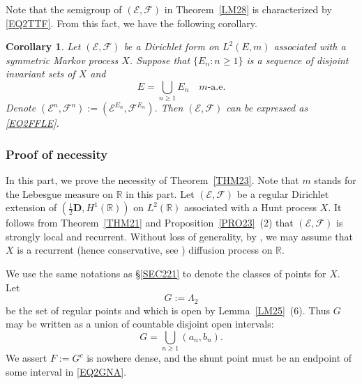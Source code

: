\documentclass[a4paper]{amsart}
\newtheorem{corollary}[theorem]{Corollary}
\theoremstyle{definition}
\theoremstyle{remark}
\numberwithin{equation}{section}
\begin{document}
Note that the semigroup of $({{\mathcal{E}}},{{\mathcal{F}}})$ in Theorem~\ref{LM28} is characterized by \eqref{EQ2TTF}. From this fact, we have the following corollary.

\begin{corollary}\label{COR210}
Let $({{\mathcal{E}}},{{\mathcal{F}}})$ be a Dirichlet form on $L^2(E,m)$ associated with a symmetric Markov process $X$. Suppose that $\{E_n:n\geq 1\}$ is a sequence of disjoint invariant sets of $X$ and
\[
	E=\bigcup_{n\geq 1}E_n \quad m\text{-a.e.}
\]
Denote $({{\mathcal{E}}}^n,{{\mathcal{F}}}^n):=({{\mathcal{E}}}^{E_n}, {{\mathcal{F}}}^{E_n})$. Then $({{\mathcal{E}}},{{\mathcal{F}}})$ can be expressed as \eqref{EQ2FFLE}.
\end{corollary}

\subsubsection{Proof of necessity}\label{SEC224}

In this part, we prove the necessity of Theorem~\ref{THM23}. Note that $m$ stands for the Lebesgue measure on $\mathbb{R}$ in this part.
Let $({{\mathcal{E}}},{{\mathcal{F}}})$ be a regular Dirichlet extension of $(\frac{1}{2}\mathbf{D}, H^1(\mathbb{R}))$ on $L^2(\mathbb{R})$ associated with a Hunt process $X$. It follows from Theorem~\ref{THM21} and Proposition~\ref{PRO23}~(2) that $({{\mathcal{E}}},{{\mathcal{F}}})$ is strongly local and recurrent. Without loss of generality, by \cite[Theorem~4.5.1~(3)]{FOT11}, we may assume that $X$ is a recurrent (hence conservative, see \cite[Lemma~1.6.5]{FOT11}) diffusion process on $\mathbb{R}$.

We use the same notations as \S\ref{SEC221} to denote the classes of points for $X$. Let
\[
	G:=\Lambda_2
\]
be the set of regular points and which is open by Lemma~\ref{LM25}~(6). Thus $G$ may be written as a union of countable disjoint open intervals:
\begin{equation}\label{EQ2GNA}
	G=\bigcup_{n\geq 1}(a_n,b_n).
\end{equation}
We assert $F:=G^c$ is nowhere dense, and the shunt point must be an endpoint of some interval in \eqref{EQ2GNA}.
\end{document}
